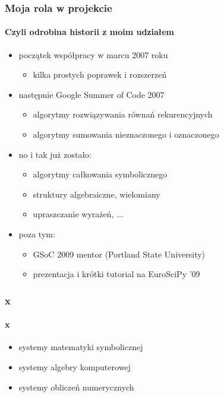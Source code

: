 \documentclass{beamer}
\begin{document}
\begin{frame}
    \frametitle{Moja rola w projekcie}
    \framesubtitle{Czyli odrobina historii z moim udziałem}

    \begin{itemize}
        \item początek współpracy w marcu 2007 roku
            \begin{itemize}
                \item kilka prostych poprawek i rozszerzeń
            \end{itemize}
            \pause
        \item następnie Google Summer of Code 2007
            \begin{itemize}
                \item algorytmy rozwiązywania równań rekurencyjnych
                \item algorytmy sumowania nieznaczonego i oznaczonego
            \end{itemize}
            \pause
        \item no i tak już zostało:
            \begin{itemize}
                \item algorytmy całkowania symbolicznego
                \item struktury algebraiczne, wielomiany
                \item upraszczanie wyrażeń, $\ldots$
            \end{itemize}
            \pause
        \item poza tym:
            \begin{itemize}
                \item GSoC 2009 mentor (Portland State University)
                \item prezentacja i krótki tutorial na EuroSciPy '09
            \end{itemize}
    \end{itemize}
\end{frame}

\begin{frame}
    \frametitle{x}
    \framesubtitle{x}

    \begin{itemize}
        \item systemy matematyki symbolicznej
        \item systemy algebry komputerowej
        \item systemy obliczeń numerycznych
    \end{itemize}
\end{frame}
\end{document}
